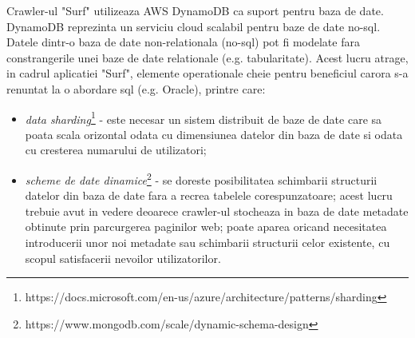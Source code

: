 \noindent
Crawler-ul "Surf" utilizeaza AWS DynamoDB ca suport pentru baza de date. DynamoDB reprezinta un serviciu cloud scalabil pentru baze de date no-sql. Datele dintr-o baza de date non-relationala (no-sql) pot fi modelate fara constrangerile unei baze de date relationale (e.g. tabularitate). Acest lucru atrage, in cadrul aplicatiei "Surf", elemente operationale cheie pentru beneficiul carora s-a renuntat la o abordare sql (e.g. Oracle), printre care:


\begin{itemize}

	\item{\emph{data sharding}\footnote{https://docs.microsoft.com/en-us/azure/architecture/patterns/sharding} - este necesar un sistem distribuit de baze de date care sa poata scala orizontal odata cu dimensiunea datelor din baza de date si odata cu cresterea numarului de utilizatori;}
	\item{\emph{scheme de date dinamice}\footnote{https://www.mongodb.com/scale/dynamic-schema-design} - se doreste posibilitatea schimbarii structurii datelor din baza de date fara a recrea tabelele corespunzatoare; acest lucru trebuie avut in vedere deoarece crawler-ul stocheaza in baza de date metadate obtinute prin parcurgerea paginilor web; poate aparea oricand necesitatea introducerii unor noi metadate sau schimbarii structurii celor existente, cu scopul satisfacerii nevoilor utilizatorilor.}
	
\end{itemize}

